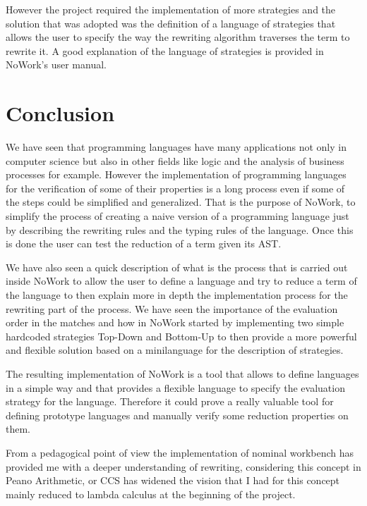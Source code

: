 \documentclass[12pt,a4paper]{article}
\begin{document}
However the project required the implementation of more
strategies and the solution that was adopted was the definition of a
language of strategies that allows the user to specify the way the
rewriting algorithm traverses the term to rewrite it. A good
explanation of the language of strategies is provided in NoWork's user
manual. 
\section{Conclusion}

We have seen that programming languages have many applications not
only in computer science but also in other fields like logic and the
analysis of business processes for example. However the implementation
of programming languages for the verification of some of their
properties is a long process even if some of the steps could be
simplified and generalized. That is the purpose of NoWork, to simplify
the process of creating a naive version of a programming language just
by describing the rewriting rules and the typing rules of the
language. Once this is done the user can test the reduction of a term
given its AST.


We have also seen a quick description of what is the process that is
carried out inside NoWork to allow the user to define a language and
try to reduce a term of the language to then explain more in depth the
implementation process for the rewriting part of the process. We have
seen the importance of the evaluation order in the matches and how in
NoWork started by implementing two simple hardcoded strategies
Top-Down and Bottom-Up to then provide a more powerful and flexible
solution based on a minilanguage for the description of strategies.

The resulting implementation of NoWork is a tool that allows to
define languages in a simple way and that provides a flexible language
to specify the evaluation strategy for the language. Therefore it
could prove a really valuable tool for defining prototype languages
and manually verify some reduction properties on them.

From a pedagogical point of view the implementation of nominal
workbench has provided me with a deeper understanding of rewriting,
considering this concept in Peano Arithmetic, or CCS has widened the
vision that I had for this concept mainly reduced to lambda calculus
at the beginning of the project.


\end{document}

